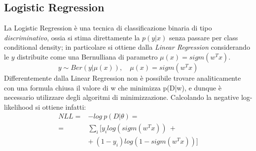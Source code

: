 \documentclass[a4paper,8pt]{article}
\begin{document}
\begin{multicols}{2}
\section{Logistic Regression}
La Logistic Regression è una tecnica di classificazione binaria di tipo \emph{discriminativo}, ossia si stima direttamente la $p(y|x)$ senza passare per class conditional density; in particolare si ottiene dalla \emph{Linear Regression} considerando le $y$ distribuite come una Bernulliana di parametro $\mu(x) = sigm(w^Tx)$.
\begin{equation}
y \sim Ber (y|\mu(x)), \quad \mu(x) = sigm(w^Tx)
\end{equation}
Differentemente dalla Linear Regression non è possibile trovare analiticamente con una formula chiusa il valore di w che minimizza p(D|w), e dunque è necessario utilizzare degli algoritmi di minimizzazione.
Calcolando la negative log-likelihood si ottiene infatti:
\begin{equation}
\begin{split}
NLL = &-log\ p(D|\theta) = \\
=\ &\sum_{i} [y_ilog( sigm(w^Tx)) \ + \\
&+\ (1- y_i)log(1 - sigm(w^Tx))  ]
\end{split}
\end{equation}



\end{multicols}
\end{document}
